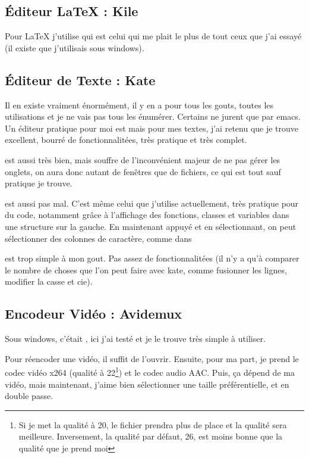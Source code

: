 \documentclass[a4paper,twoside]{article}
\begin{document}
\subsection{\'Editeur \LaTeX{} : Kile}
Pour \LaTeX{} j'utilise  qui est celui qui me plait le plus de tout ceux que j'ai essayé (il existe  que j'utilisais sous windows).

\subsection{\'Editeur de Texte : Kate}
Il en existe vraiment énormément, il y en a pour tous les gouts, toutes les utilisations et je ne vais pas tous les énumérer. Certains ne jurent que par emacs. Un éditeur pratique pour moi est  mais pour mes textes, j'ai retenu  que je trouve excellent, bourré de fonctionnalitées, très pratique et très complet.

 est aussi très bien, mais souffre de l'inconvénient majeur de ne pas gérer les onglets, on aura donc autant de fenêtres que de fichiers, ce qui est tout sauf pratique je trouve.

 est aussi pas mal. C'est même celui que j'utilise actuellement, très pratique pour du code, notamment grâce à l'affichage des fonctions, classes et variables dans une structure sur la gauche. En maintenant  appuyé et en sélectionnant, on peut sélectionner des colonnes de caractère, comme dans 

 est trop simple à mon gout. Pas assez de fonctionnalitées (il n'y a qu'à comparer le nombre de choses que l'on peut faire avec kate, comme fusionner les lignes, modifier la casse et cie).

\subsection{Encodeur Vidéo : Avidemux}
Sous windows, c'était , ici j'ai testé  et je le trouve très simple à utiliser.

Pour réencoder une vidéo, il suffit de l'ouvrir. Ensuite, pour ma part, je prend le codec vidéo x264 (qualité à 22\footnote{Si je met la qualité à 20, le fichier prendra plus de place et la qualité sera meilleure. Inversement, la qualité par défaut, 26, est moins bonne que la qualité que je prend moi}) et le codec audio AAC. Puis, ça dépend de ma vidéo, mais maintenant, j'aime bien sélectionner une taille préférentielle, et en double passe.
\end{document}
